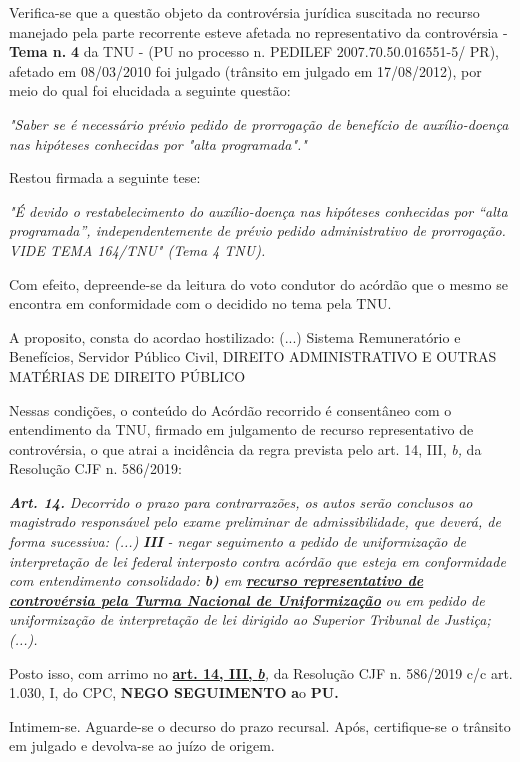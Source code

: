 \documentclass[12pt]{article}
\begin{document}
\justifying
\noindent Verifica-se que a questão objeto da controvérsia jurídica suscitada no recurso manejado pela parte recorrente esteve afetada no representativo da controvérsia - \textbf{Tema n. }\textbf{4} da TNU - (PU no processo n. PEDILEF 2007.70.50.016551-5/ PR),  afetado em 08/03/2010 foi julgado (trânsito em julgado em 17/08/2012), por meio do qual foi elucidada a seguinte questão:

\noindent \textit{"Saber se é necessário prévio pedido de prorrogação de benefício de auxílio-doença nas hipóteses conhecidas por "alta programada"."}

\noindent Restou firmada a seguinte tese:

\noindent \textit{"É devido o restabelecimento do auxílio-doença nas hipóteses conhecidas por “alta programada”, independentemente de prévio pedido administrativo de prorrogação. VIDE TEMA 164/TNU" (Tema 4 TNU).}

\noindent Com efeito, depreende-se da leitura do voto condutor do acórdão que o mesmo se encontra em conformidade com o decidido no  tema pela TNU.

\noindent A proposito, consta do acordao hostilizado: (...) Sistema Remuneratório e Benefícios, Servidor Público Civil, DIREITO ADMINISTRATIVO E OUTRAS MATÉRIAS DE DIREITO PÚBLICO

\noindent Nessas condições, o conteúdo do Acórdão recorrido é consentâneo com o entendimento da TNU, firmado em julgamento de recurso representativo de controvérsia, o que atrai a incidência da regra prevista pelo art. 14, III, \textit{b,} da Resolução CJF n. 586/2019:

\noindent \textit{\textbf{Art. 14.}}\textit{ Decorrido o prazo para contrarrazões, os autos serão conclusos ao magistrado responsável pelo exame preliminar de admissibilidade, que deverá, de forma sucessiva: (...) }\textit{\textbf{III }}\textit{- negar seguimento a pedido de uniformização de interpretação de lei federal interposto contra acórdão que esteja em conformidade com entendimento consolidado: }\textit{\textbf{b)}}\textit{ em }\uline{\textit{\textbf{recurso representativo de controvérsia pela Turma Nacional de Uniformização}}}\textit{ ou em pedido de uniformização de interpretação de lei dirigido ao Superior Tribunal de Justiça;(...).}

\noindent Posto isso, com arrimo no \uline{\textbf{art. 14, III, }}\uline{\textit{\textbf{b}}}\textit{,} da Resolução CJF n. 586/2019 c/c art. 1.030, I, do CPC, \textbf{NEGO SEGUIMENTO }\textbf{a}o\textbf{ PU}\textbf{.}

\noindent Intimem-se. Aguarde-se o decurso do prazo recursal. Após, certifique-se o trânsito em julgado e devolva-se ao juízo de origem.
\end{document}
